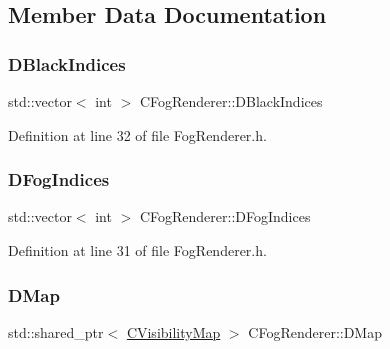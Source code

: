 \subsection{Member Data Documentation}
\hypertarget{classCFogRenderer_a09e3b546abbe52cc9addd1edfcc5ea9c}{}\label{classCFogRenderer_a09e3b546abbe52cc9addd1edfcc5ea9c} 
\subsubsection{\texorpdfstring{D\+Black\+Indices}{DBlackIndices}}
{\footnotesize\ttfamily std\+::vector$<$ int $>$ C\+Fog\+Renderer\+::\+D\+Black\+Indices\hspace{0.3cm}{\ttfamily [protected]}}



Definition at line 32 of file Fog\+Renderer.\+h.

\hypertarget{classCFogRenderer_a2028e4642e756016819aab6567800af5}{}\label{classCFogRenderer_a2028e4642e756016819aab6567800af5} 
\subsubsection{\texorpdfstring{D\+Fog\+Indices}{DFogIndices}}
{\footnotesize\ttfamily std\+::vector$<$ int $>$ C\+Fog\+Renderer\+::\+D\+Fog\+Indices\hspace{0.3cm}{\ttfamily [protected]}}



Definition at line 31 of file Fog\+Renderer.\+h.

\hypertarget{classCFogRenderer_a06be3616da23b5fce8ab3407b81788a4}{}\label{classCFogRenderer_a06be3616da23b5fce8ab3407b81788a4} 
\subsubsection{\texorpdfstring{D\+Map}{DMap}}
{\footnotesize\ttfamily std\+::shared\+\_\+ptr$<$ \hyperlink{classCVisibilityMap}{C\+Visibility\+Map} $>$ C\+Fog\+Renderer\+::\+D\+Map\hspace{0.3cm}{\ttfamily [protected]}}



